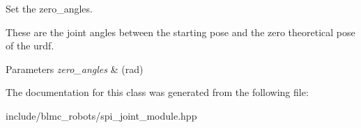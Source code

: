 Set the zero\+\_\+angles. 

These are the joint angles between the starting pose and the zero theoretical pose of the urdf.


\begin{DoxyParams}{Parameters}
{\em zero\+\_\+angles} & (rad) \\
\hline
\end{DoxyParams}


The documentation for this class was generated from the following file\+:\begin{DoxyCompactItemize}
\item 
include/blmc\+\_\+robots/spi\+\_\+joint\+\_\+module.\+hpp\end{DoxyCompactItemize}
